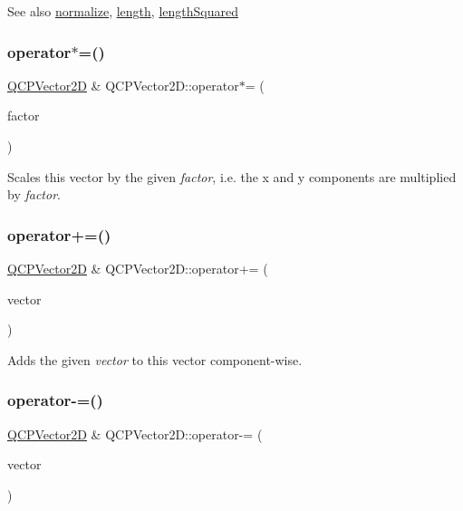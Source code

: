 \begin{DoxySeeAlso}{See also}
\hyperlink{classQCPVector2D_ad83268be370685c2a0630acc0fb1a425}{normalize}, \hyperlink{classQCPVector2D_a10adb5ab031fe94f0b64a3c5aefb552e}{length}, \hyperlink{classQCPVector2D_a766585459d84cb149334fda1a498b2e5}{length\+Squared} 
\end{DoxySeeAlso}
\mbox{\label{classQCPVector2D_aa52a246d168f475a4231c7bdfdac7df1}} 
\subsubsection{\texorpdfstring{operator$\ast$=()}{operator*=()}}
{\footnotesize\ttfamily \hyperlink{classQCPVector2D}{Q\+C\+P\+Vector2D} \& Q\+C\+P\+Vector2\+D\+::operator$\ast$= (\begin{DoxyParamCaption}\item[{double}]{factor }\end{DoxyParamCaption})}

Scales this vector by the given {\itshape factor}, i.\+e. the x and y components are multiplied by {\itshape factor}. \mbox{\label{classQCPVector2D_aa2c34754ce8839b2d074dec741783c5e}} 
\subsubsection{\texorpdfstring{operator+=()}{operator+=()}}
{\footnotesize\ttfamily \hyperlink{classQCPVector2D}{Q\+C\+P\+Vector2D} \& Q\+C\+P\+Vector2\+D\+::operator+= (\begin{DoxyParamCaption}\item[{const \hyperlink{classQCPVector2D}{Q\+C\+P\+Vector2D} \&}]{vector }\end{DoxyParamCaption})}

Adds the given {\itshape vector} to this vector component-\/wise. \mbox{\label{classQCPVector2D_a3a2e906bb924983bb801e89f28a3d566}} 
\subsubsection{\texorpdfstring{operator-\/=()}{operator-=()}}
{\footnotesize\ttfamily \hyperlink{classQCPVector2D}{Q\+C\+P\+Vector2D} \& Q\+C\+P\+Vector2\+D\+::operator-\/= (\begin{DoxyParamCaption}\item[{const \hyperlink{classQCPVector2D}{Q\+C\+P\+Vector2D} \&}]{vector }\end{DoxyParamCaption})}

